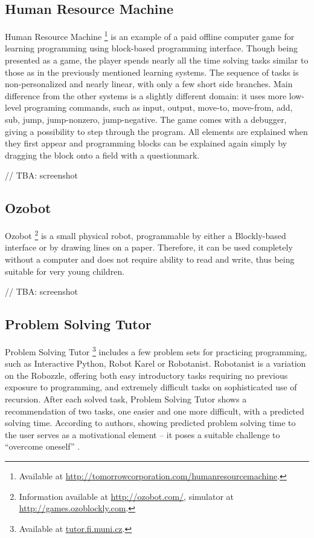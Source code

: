 \documentclass[
    digital,
    color,
    11pt,
    nocover,
    table,  %
    nolof,  %
    nolot,  %
    microtype,
]{fithesis3}
\begin{document}
\subsection{Human Resource Machine}
\label{sec:human-resource-machine}
Human Resource Machine%
\footnote{Available at \url{http://tomorrowcorporation.com/humanresourcemachine}.}
is an example of a paid offline computer game for learning programming using block-based programming interface.
Though being presented as a game,
the player spends nearly all the time solving tasks similar to those as in the previously mentioned learning systems.
The sequence of tasks is non-personalized and nearly linear,
with only a few short side branches.
Main difference from the other systems is a slightly different domain:
it uses more low-level programing commands, such as
input, output, move-to, move-from, add, sub, jump, jump-nonzero, jump-negative.
The game comes with a debugger, giving a possibility to step through the program.
All elements are explained when they first appear and programming blocks can be explained again simply by dragging the block onto a field with a questionmark.

// TBA: screenshot


\subsection{Ozobot}
\label{sec:ozobot}
Ozobot%
\footnote{Information available at \url{http://ozobot.com/}, simulator at \url{http://games.ozoblockly.com}.}
is a small physical robot,
programmable by either a Blockly-based interface or by drawing lines on a paper.
Therefore, it can be used completely without a computer and does not require ability to read and write,
thus being suitable for very young children.

// TBA: screenshot


\subsection{Problem Solving Tutor}
\label{sec:problem-solving-tutor}
Problem Solving Tutor%
\footnote{Available at \url{tutor.fi.muni.cz}.}
includes a few problem sets for practicing programming,
such as Interactive Python, Robot Karel or Robotanist.
Robotanist is a variation on the Robozzle,
offering both easy introductory tasks requiring no previous exposure to programming,
and extremely difficult tasks on sophisticated use of recursion.
After each solved task, Problem Solving Tutor shows a recommendation of two tasks,
one easier and one more difficult,
with a predicted solving time.
According to authors, showing predicted problem solving time to the user serves as a motivational element
– it poses a suitable challenge to ``overcome oneself''
\cite{pelanek-student-modeling-times}.
\end{document}
